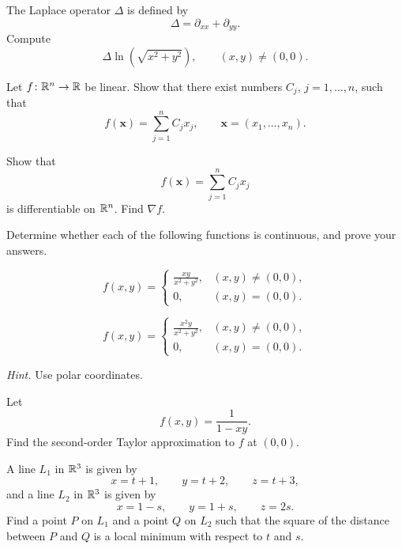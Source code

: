 \begin{problem}
The Laplace operator $\Delta$ is defined by
\[
\Delta=\partial_{xx}+\partial_{yy}.
\]
Compute
\[
\Delta\ln\!\left(\sqrt{x^2+y^2}\right),
\qquad (x, y)\ne(0, 0).
\]
\end{problem}

\begin{problem}
\begin{problemsubparts}
\item Let $f\colon\mathbb{R}^n\to\mathbb{R}$ be linear. Show that there exist numbers $C_j$, $j=1, \ldots, n$, such that
\[
f(\mathbf x)=\sum_{j=1}^n C_jx_j,
\qquad \mathbf x=(x_1, \ldots, x_n).
\]
\item Show that
\[
f(\mathbf x)=\sum_{j=1}^n C_jx_j
\]
is differentiable on $\mathbb{R}^n$. Find $\nabla f$.
\end{problemsubparts}
\end{problem}

\begin{problem}
Determine whether each of the following functions is continuous, and prove your answers.
\begin{problemsubparts}
\item
\[
f(x, y)=
\begin{cases}
\displaystyle\frac{xy}{x^2+y^2}, & (x, y)\ne(0, 0), \\[0.55em]
0, & (x, y)=(0, 0).
\end{cases}
\]
\item
\[
f(x, y)=
\begin{cases}
\displaystyle\frac{x^2y}{x^2+y^2}, & (x, y)\ne(0, 0), \\[0.55em]
0, & (x, y)=(0, 0).
\end{cases}
\]
\end{problemsubparts}
\noindent\textit{Hint.} Use polar coordinates.
\end{problem}

\begin{problem}
Let
\[
f(x, y)=\frac1{1-xy}.
\]
Find the second-order Taylor approximation to $f$ at $(0, 0)$.
\end{problem}

\begin{problem}
A line $L_1$ in $\mathbb{R}^3$ is given by
\[
x=t+1,
\qquad y=t+2,
\qquad z=t+3,
\]
and a line $L_2$ in $\mathbb{R}^3$ is given by
\[
x=1-s,
\qquad y=1+s,
\qquad z=2s.
\]
Find a point $P$ on $L_1$ and a point $Q$ on $L_2$ such that the square of the distance between $P$ and $Q$ is a local minimum with respect to $t$ and $s$.
\end{problem}

